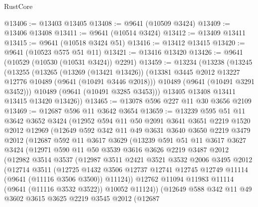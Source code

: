 \begin{lexlean}{RustCore}
\begin{coremodule}
@13406 := @13403 @13405
@13408 := @9641 (@10509 @3424)
@13409 := @13406 @13408
@13411 := @9641 (@10514 @3424)
@13412 := @13409 @13411
@13415 := @9641 (@10518 @3424 @51)
@13416 := @13412 @13415
@13420 := @9641 (@10523 @575 @51 @11)
@13421 := @13416 @13420
@13426 := @9641 (@10529 (@10530 (@10531 @3424)) @2291)
@13459 := @13234
    (@13238
      (@13245
        (@13255
          (@13265
            (@13269 (@13421 @13426))
            (@13381 @3445 @2012 @13227 @12776 @10489 (@9641 (@10491 @3446 @2018)))
            @10489
            (@9641 (@10491 @3291 @3452)))
          @10489
          (@9641 (@10491 @3285 @3453)))
        @13405
        @13408
        @13411
        @13415
        @13420
        @13426))
@13465 := @13078 @596 @227 @11 @30 @3656 @2109
@13469 := @12687 @596 @11 @3642 @3654
@13659 := @13239
    @595
    @51
    @11
    @3642
    @3652
    @3424
    (@12952
      @594
      @11
      @50
      @2091
      @3641
      @3651
      @2219
      @1520
      @2012
      @12969
      (@12649
        @592
        @342
        @11
        @49
        @3631
        @3640
        @3650
        @2219
        @3479
        @2012
        (@12687
          @592
          @11
          @3617
          @3629
          (@13239
            @591
            @51
            @11
            @3617
            @3627
            @3424
            (@12971
              @590
              @11
              @50
              @3539
              @3616
              @3626
              @2219
              @3487
              @2012
              (@12982
                @3514
                @3537
                (@12987
                  @3511
                  @2421
                  @3521
                  @3532
                  @2006
                  @3495
                  @2012
                  (@12714
                    @3511
                    (@12725
                      @1432
                      @3506
                      @12737
                      @12741
                      @12745
                      @12749
                      @11114
                      (@9641 (@11116 @3506 @3500))
                      @11124))
                  @12762
                  @11094
                  @11983
                  @11114
                  (@9641 (@11116 @3532 @3522))
                  @10052
                  @11124))
              (@12649
                @588
                @342
                @11
                @49
                @3602
                @3615
                @3625
                @2219
                @3545
                @2012
                (@12687

\end{coremodule}
\end{lexlean}
